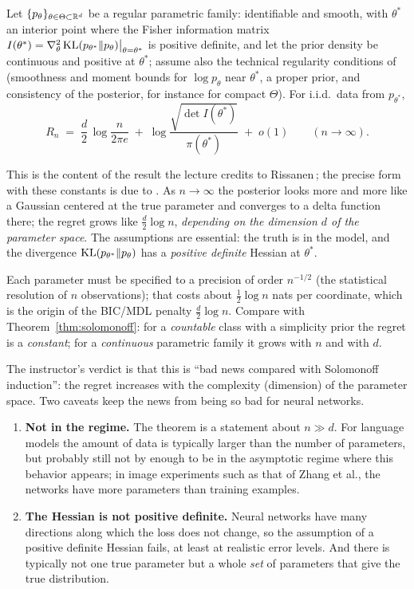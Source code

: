 \begin{thm}\label{thm:rissanen}
Let $\{p_\theta\}_{\theta\in\Theta\subset\mathbb{R}^d}$ be a regular parametric family: identifiable and smooth, with $\theta^*$ an interior point where the Fisher information matrix $I(\theta^*)=\nabla^2_\theta\operatorname{KL}(p_{\theta^*}\|p_\theta)\big|_{\theta=\theta^*}$ is positive definite, and let the prior density be continuous and positive at $\theta^*$; assume also the technical regularity conditions of \citet{clarke1990} (smoothness and moment bounds for $\log p_\theta$ near $\theta^*$, a proper prior, and consistency of the posterior, for instance for compact $\Theta$). For i.i.d.\ data from $p_{\theta^*}$,
\[
  R_n\;=\;\frac d2\,\log\frac{n}{2\pi e}\;+\;\log\frac{\sqrt{\det I(\theta^*)}}{\pi(\theta^*)}\;+\;o(1)\qquad(n\to\infty).
\]
\end{thm}
\noindent This is the content of the result the lecture credits to Rissanen\,\citep{rissanen1986,rissanen1996}; the precise form with these constants is due to \citet{clarke1990}. As $n\to\infty$ the posterior looks more and more like a Gaussian centered at the true parameter and converges to a delta function there; the regret grows like $\tfrac d2\log n$, \emph{depending on the dimension $d$ of the parameter space}.
The assumptions are essential: the truth is in the model, and the divergence $\operatorname{KL}(p_{\theta^*}\|p_\theta)$ has a \emph{positive definite} Hessian at $\theta^*$.

\begin{intuition}
Each parameter must be specified to a precision of order $n^{-1/2}$ (the statistical resolution of $n$ observations); that costs about $\tfrac12\log n$ nats per coordinate, which is the origin of the BIC/MDL penalty $\tfrac d2\log n$. Compare with Theorem~\ref{thm:solomonoff}: for a \emph{countable} class with a simplicity prior the regret is a \emph{constant}; for a \emph{continuous} parametric family it grows with $n$ and with $d$.
\end{intuition}

The instructor's verdict is that this is ``bad news compared with Solomonoff induction'': the regret increases with the complexity (dimension) of the parameter space. Two caveats keep the news from being so bad for neural networks.

\begin{enumerate}
  \item \textbf{Not in the regime.} The theorem is a statement about $n\gg d$. For language models the amount of data is typically larger than the number of parameters, but probably still not by enough to be in the asymptotic regime where this behavior appears; in image experiments such as that of Zhang et al., the networks have more parameters than training examples.
  \item \textbf{The Hessian is not positive definite.} Neural networks have many directions along which the loss does not change, so the assumption of a positive definite Hessian fails, at least at realistic error levels. And there is typically not one true parameter but a whole \emph{set} of parameters that give the true distribution.
\end{enumerate}

